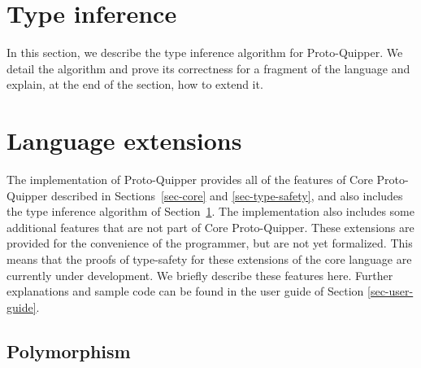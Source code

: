 \documentclass[twoside]{article}
\begin{document}
\section{Type inference}\label{sec-inference}

In this section, we describe the type inference algorithm 
for Proto-Quipper. We detail the algorithm and prove its 
correctness for a fragment of the language and explain, 
at the end of the section, how to extend it.




\clearpage
\section{Language extensions}
\label{sec-extensions}

The implementation of Proto-Quipper provides all of the features of
Core Proto-Quipper described in Sections~\ref{sec-core} and
{\ref{sec-type-safety}}, and also includes the type inference
algorithm of Section~\ref{sec-inference}. The implementation also
includes some additional features that are not part of Core
Proto-Quipper. These extensions are provided for the convenience of
the programmer, but are not yet formalized. This means that the proofs 
of type-safety for these extensions of the core language are 
currently under development. We briefly describe these features 
here. Further explanations and sample code can be found in the 
user guide of Section \ref{sec-user-guide}.

\subsection{Polymorphism} 
\end{document}
